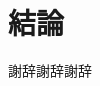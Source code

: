 \documentclass{css}
\begin{document}
%

\section{結論}



\begin{acknowledgment}
謝辞謝辞謝辞
\end{acknowledgment}



\end{document}
